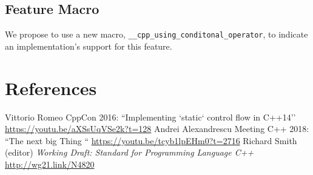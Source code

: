 \documentclass[11pt]{article}
\begin{document}
\subsection{Feature Macro}

We propose to use a new macro,
\texttt{\_\_cpp\_using\_conditonal\_operator}, to indicate an
implementation's support for this feature.

\iffalse
\section{Design Decisions}

\subsection{Extension to other lists}

One of the points that was raised in the \texttt{std-proposals} 2015
discussion was whether to allow trailing commas for all lists,
incl.\ e.g.\ function arguments. We welcome such discussion, but deem
it outside the scope of this proposal for at least its first
iteration, mainly because there is no general ``list'' grammar
production in the standard to which a change could be uniformly
applied, and other types of lists have not seen the same kinds effort
being spent on work-arounds that \emph{ctor-initalizer} has
``enjoyed''.

\section{Acknowledgements}

Arthur O'Dwyer provided the wording on which this proposal is based.\cite{std}
\fi

\section{References}
\renewcommand{\section}[2]{}%
\begin{thebibliography}{9}
  Vittorio Romeo\newline
  CppCon 2016: ``Implementing `static` control flow in C++14''\newline
  \url{https://youtu.be/aXSsUqVSe2k?t=128}
  Andrei Alexandrescu\newline
  Meeting C++ 2018: ``The next big Thing ``\newline
  \url{https://youtu.be/tcyb1lpEHm0?t=2716}
  Richard Smith (editor)\newline
  \emph{Working Draft: Standard for Programming Language C++}\newline
  \url{http://wg21.link/N4820}
\end{thebibliography}
\end{document}
